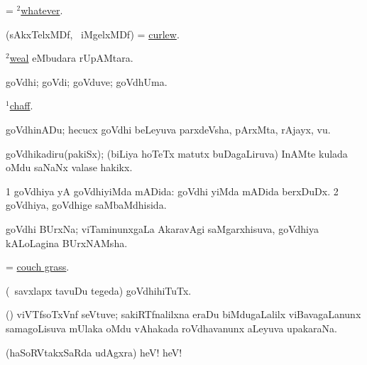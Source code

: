 \bentry
{} 
\expl{}
\bmng
= \hyperlink{whatever(2)}{$^2$whatever}. 
\emng
\eentry

\bentry
{} 
\gl{\nA}
\expl{}
\bmng
(sAkxTelxMDf, \kanu\ iMgelxMDf) = \hyperref{kandict_c.pdf}{C}{curlew}{curlew}. 
\emng
\eentry

\bentry
{} 
\gl{\nA}
\expl{}
\bmng
\hyperlink{weal(2)}{$^2$weal} eMbudara rUpAMtara. 
\emng
\eentry

\bentry
{} 
\gl{\nA}
\expl{}
\bmng
goVdhi; goVdi; goVduve; goVdhUma. 
\emng

\noindent 
\gl{\pagu}
\expl{}
\bmng
{} \hyperref{kandict_c.pdf}{C}{chaff(1) nuga(1)}{$^1$chaff}. 
\emng
\eentry

\bentry 
{} 
\gl{\nA}
\expl{}
\bmng
goVdhinADu; hecucx goVdhi beLeyuva parxdeVsha, pArxMta, rAjayx, \mo vu. 
\emng
\eentry

\bentry
{} 
\gl{\nA}
\expl{}
\bmng
goVdhikadiru(pakiSx); (biLiya hoTeTx matutx buDagaLiruva) InAMte  kulada oMdu saNaNx valase hakikx. 
\emng
\eentry

 
\bentry
{} 
\gl{\gu}
\expl{}
\bmng
\bnum
\num{1} goVdhiya yA goVdhiyiMda mADida:  goVdhi yiMda mADida berxDuDx. 
\num{2} goVdhiya, goVdhige saMbaMdhisida. 
\enum
\emng
\eentry

\bentry
{} 
\gl{\nA}
\expl{}
\bmng
goVdhi BUrxNa; viTaminunxgaLa AkaravAgi saMgarxhisuva, goVdhiya kALoLagina BUrxNAMsha. 
\emng
\eentry

\bentry
{} 
\gl{\nA}
\expl{}
\bmng
= \hyperref{kandict_c.pdf}{C}{couch grass}{couch grass}.
\emng
\eentry

\bentry
{} 
\gl{\nA}
\expl{}
\bmng
(\kanmu\ savxlapx tavuDu tegeda) goVdhihiTuTx. 
\emng
\eentry

\bentry
{} 
\gl{\nA}
\expl{}
\bmng
(\Bwvi) viVTfsoTxVnf seVtuve; sakiRTfnalilxna eraDu biMdugaLalilx viBavagaLanunx samagoLisuva mUlaka oMdu vAhakada roVdhavanunx aLeyuva upakaraNa. 
\emng
\eentry

\bentry
{} 
\gl{\BAavayx}
\expl{}
\bmng
(haSoRVtakxSaRda udAgxra) heV! heV! 
\emng
\eentry

